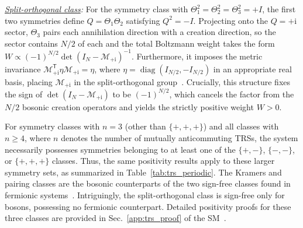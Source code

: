 \documentclass[twocolumn,aps,prl,amsmath,amssymb,superscriptaddress,longbibliography]{revtex4-2}
\newcommand{\diag}{\operatorname{diag}}
\newcommand{\ii}{\mathrm{i}}
\newcommand{\trans}{\mathsf{T}}
\newcommand{\mc}[1]{\mathcal{#1}}
\begin{document}
\emph{\underline{Split-orthogonal class}:} For the symmetry class with $\Theta_1^2=\Theta_2^2=\Theta_3^2=+I$, the first two symmetries define $Q=\Theta_1\Theta_2$ satisfying $Q^2=-I$. Projecting onto the $Q=+\ii$ sector, $\Theta_3$ pairs each annihilation direction with a creation direction, so the sector contains $N/2$ of each and the total Boltzmann weight takes the form $W\propto(-1)^{N/2}\det(I_N-\mc M_{+\ii})^{-1}$. Furthermore, it imposes the metric invariance $\mc M_{+\ii}^\trans\eta\mc M_{+\ii}=\eta$, where $\eta=\diag(I_{N/2},-I_{N/2})$ in an appropriate real basis, placing $\mc M_{+\ii}$ in the split-orthogonal group~\cite{wang2015prl}. Crucially, this structure fixes the sign of $\det(I_N-\mc M_{+\ii})$ to be $(-1)^{N/2}$, which cancels the factor from the $N/2$ bosonic creation operators and yields the strictly positive weight $W>0$.

 For symmetry classes with $n=3$ (other than $\{+,+,+\}$) and all classes with $n \geq 4$, where $n$ denotes the number of mutually anticommuting TRSs, the system necessarily possesses symmetries belonging to at least one of the $\{+,-\}$, $\{-,-\}$, or $\{+,+,+\}$ classes. Thus, the same positivity results apply to these larger symmetry sets, as summarized in Table~\ref{tab:trs_periodic}. The Kramers and pairing classes are the bosonic counterparts of the two sign-free classes found in fermionic systems~\cite{li2016prl}. Intriguingly, the split-orthogonal class is sign-free only for bosons, possessing no fermionic counterpart. Detailed positivity proofs for these three classes are provided in Sec.~\ref{app:trs_proof} of the SM~\cite{SM}.
\end{document}
